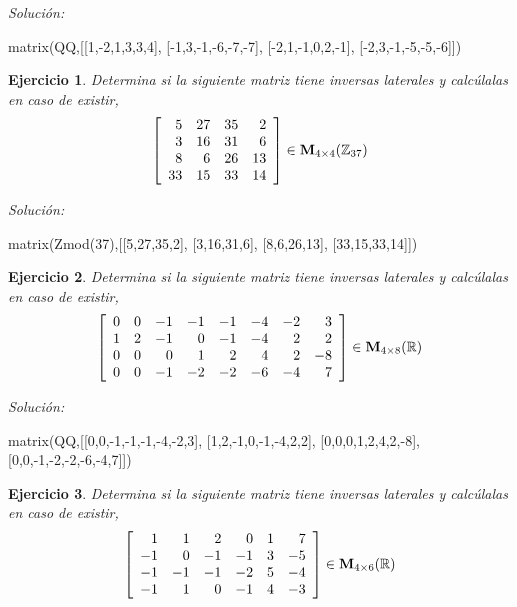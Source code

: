 \documentclass{amsart}
\newtheorem{ejer}{Ejercicio}
\begin{document}
{\it Soluci\'on:}

\begin{sageblock}
matrix(QQ,[[1,-2,1,3,3,4],
[-1,3,-1,-6,-7,-7],
[-2,1,-1,0,2,-1],
[-2,3,-1,-5,-5,-6]])
\end{sageblock}



\begin{ejer} Determina si la siguiente matriz tiene inversas laterales y calc\'ulalas en caso de existir,
\[ \left[\begin{array}{rrrr}
5 & 27 & 35 & 2 \\
3 & 16 & 31 & 6 \\
8 & 6 & 26 & 13 \\
33 & 15 & 33 & 14
\end{array}\right] \in {\bf M}_{4\times 4}({\mathbb Z}_{37})\]
\end{ejer}

{\it Soluci\'on:}

\begin{sageblock}
matrix(Zmod(37),[[5,27,35,2],
[3,16,31,6],
[8,6,26,13],
[33,15,33,14]])
\end{sageblock}



\begin{ejer} Determina si la siguiente matriz tiene inversas laterales y calc\'ulalas en caso de existir,
\[ \left[\begin{array}{rrrrrrrr}
0 & 0 & -1 & -1 & -1 & -4 & -2 & 3 \\
1 & 2 & -1 & 0 & -1 & -4 & 2 & 2 \\
0 & 0 & 0 & 1 & 2 & 4 & 2 & -8 \\
0 & 0 & -1 & -2 & -2 & -6 & -4 & 7
\end{array}\right] \in {\bf M}_{4\times 8}({\mathbb R})\]
\end{ejer}

{\it Soluci\'on:}

\begin{sageblock}
matrix(QQ,[[0,0,-1,-1,-1,-4,-2,3],
[1,2,-1,0,-1,-4,2,2],
[0,0,0,1,2,4,2,-8],
[0,0,-1,-2,-2,-6,-4,7]])
\end{sageblock}



\begin{ejer} Determina si la siguiente matriz tiene inversas laterales y calc\'ulalas en caso de existir,
\[ \left[\begin{array}{rrrrrr}
1 & 1 & 2 & 0 & 1 & 7 \\
-1 & 0 & -1 & -1 & 3 & -5 \\
-1 & -1 & -1 & -2 & 5 & -4 \\
-1 & 1 & 0 & -1 & 4 & -3
\end{array}\right] \in {\bf M}_{4\times 6}({\mathbb R})\]
\end{ejer}
\end{document}
